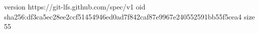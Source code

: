 version https://git-lfs.github.com/spec/v1
oid sha256:df3ca5ec28ee2ccf51454946ed0ad7f842caf87e9967e240552591bb55f5cea4
size 55
